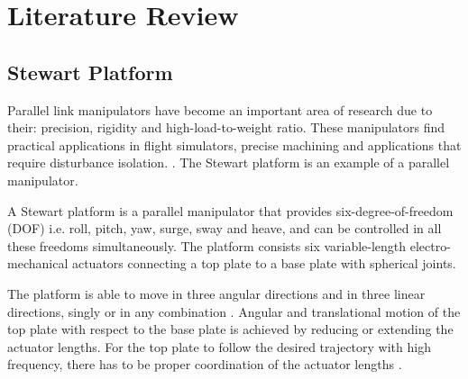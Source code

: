 \section{Literature Review}
\subsection{Stewart Platform}
Parallel link manipulators have become an important area of research due to their: precision, rigidity and high-load-to-weight ratio. These manipulators find practical applications in flight simulators, precise machining and applications that require disturbance isolation. \cite{iqbal_dynamic_2008}. The Stewart platform is an example of a parallel manipulator.

A Stewart platform is a parallel manipulator that provides six-degree-of-freedom (DOF) i.e. roll, pitch, yaw, surge, sway and heave, and can be controlled in all these freedoms simultaneously. The platform consists six variable-length electro-mechanical actuators connecting a top plate to a base plate with spherical joints.

The platform is able to move in three angular directions and in three linear directions, singly or in any combination \cite{stewart1965platform}. Angular and translational motion of the top plate with
respect to the base plate is achieved by reducing or extending the actuator lengths. For the top plate to follow the desired trajectory with high frequency, there has to be proper coordination of the actuator lengths \cite{iqbal_dynamic_2008}.

